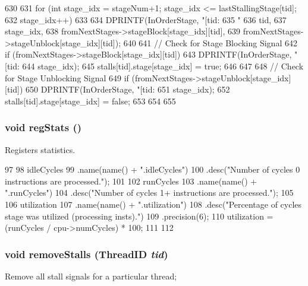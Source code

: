 \begin{DoxyCode}
630 {
631     for (int stage_idx = stageNum+1; stage_idx <= lastStallingStage[tid];
632          stage_idx++) {
633 
634         DPRINTF(InOrderStage, "[tid:%
635                 "%
636                 tid,
637                 stage_idx,
638                 fromNextStages->stageBlock[stage_idx][tid],
639                 fromNextStages->stageUnblock[stage_idx][tid]);
640 
641         // Check for Stage Blocking Signal
642         if (fromNextStages->stageBlock[stage_idx][tid]) {
643             DPRINTF(InOrderStage, "[tid:%
644                     stage_idx);
645             stalls[tid].stage[stage_idx] = true;
646         }
647 
648         // Check for Stage Unblocking Signal
649         if (fromNextStages->stageUnblock[stage_idx][tid]) {
650             DPRINTF(InOrderStage, "[tid:%
651                     stage_idx);
652             stalls[tid].stage[stage_idx] = false;
653         }
654     }
655 }
\end{DoxyCode}
\hypertarget{classPipelineStage_a4dc637449366fcdfc4e764cdf12d9b11}{
\subsubsection[{regStats}]{\setlength{\rightskip}{0pt plus 5cm}void regStats ()}}
\label{classPipelineStage_a4dc637449366fcdfc4e764cdf12d9b11}
Registers statistics. 


\begin{DoxyCode}
97 {
98    idleCycles
99         .name(name() + ".idleCycles")
100        .desc("Number of cycles 0 instructions are processed.");
101    
102     runCycles
103         .name(name() + ".runCycles")
104         .desc("Number of cycles 1+ instructions are processed.");
105 
106     utilization
107         .name(name() + ".utilization")
108         .desc("Percentage of cycles stage was utilized (processing insts).")
109         .precision(6);
110     utilization = (runCycles / cpu->numCycles) * 100;
111     
112 }
\end{DoxyCode}
\hypertarget{classPipelineStage_af5bd22ce78c3a8bafb5b91b7b70e8a41}{
\subsubsection[{removeStalls}]{\setlength{\rightskip}{0pt plus 5cm}void removeStalls ({\bf ThreadID} {\em tid})}}
\label{classPipelineStage_af5bd22ce78c3a8bafb5b91b7b70e8a41}
Remove all stall signals for a particular thread; 


